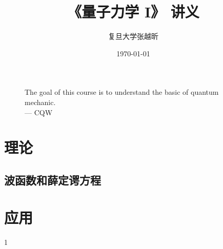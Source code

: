 \documentclass[UTF-8,heading=true,%
	zihao=-4,a4paper]{ctexbook}
\title{《量子力学 I》 讲义}
\author{\kaishu 复旦大学\quad 张越昕}
\date{\kaishu \today}
\begin{document}
\frontmatter
\maketitle
\begin{figure}
\centering
\huge The goal of this course is to understand the basic of quantum mechanic.\\
\raggedleft
\Large --- CQW
\end{figure}
\clearpage 
{}
\tableofcontents

\mainmatter
\part{理\qquad 论}
\chapter{波函数和薛定谔方程}

%
%


\part{应\qquad 用}
1
\end{document}
